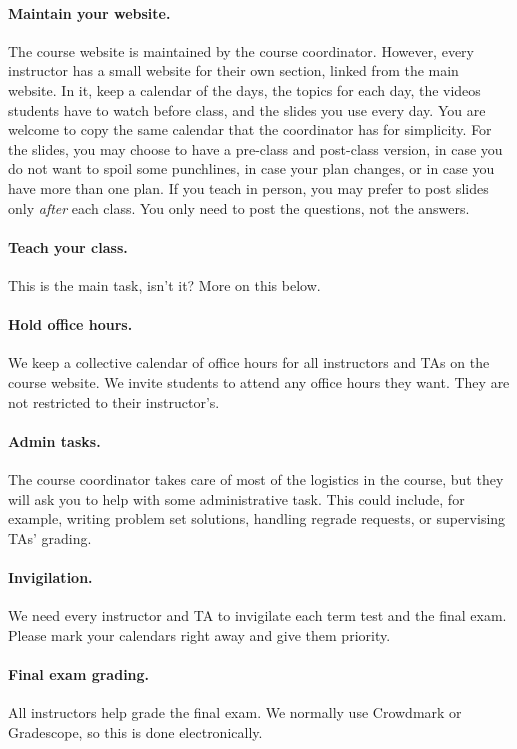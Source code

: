 \documentclass[11pt]{article}
\begin{document}
		\paragraph{Maintain your website.}  The course website is maintained by the course coordinator.  However, every instructor has a small website for their own section, linked from the main website.    In it, keep a calendar of the days, the topics for each day, the videos students have to watch before class, and the slides you use every day.  You are welcome to copy the same calendar that the coordinator has for simplicity.    For the slides, you may choose to have a pre-class and post-class version, in case you do not want to spoil some punchlines, in case your plan changes, or in case you have more than one plan.  If you teach in person, you may prefer to post slides only \emph{after} each class.  You only need to post the questions, not the answers.  
		 
		\paragraph{Teach your class.}  This is the main task, isn't it?  More on this below.
		\paragraph{Hold office hours.}   We keep a collective calendar of office hours for all instructors and TAs on the course website.  We invite students to attend any office hours they want.  They are not restricted to their instructor's.
		\paragraph{Admin tasks.}  The course coordinator takes care of most of the logistics in the course, but they will ask you to help with some administrative task. This could include, for example, writing problem set solutions, handling regrade requests, or supervising TAs' grading.
		\paragraph{Invigilation.}  We need every instructor and TA to invigilate each term test and the final exam.    Please mark your calendars right away and give them priority.  
		\paragraph{Final exam grading.}    All instructors help grade the final exam.  We normally use Crowdmark or Gradescope, so this is done electronically.  
\end{document}
